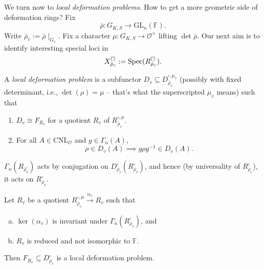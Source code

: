 \documentclass[reqno]{amsart} 
\numberwithin{theorem}{section}
\numberwithin{equation}{section}
\numberwithin{exercise}{section}
\begin{document}
We turn now to \emph{local deformation problems}.  How to get a more geometric side of deformation rings?  Fix
\begin{equation*}
  \bar{\rho} : G_{K, S} \rightarrow \mathrm{GL}_n(\mathbb{F}).
\end{equation*}
Write $\bar{\rho}_v := \bar{\rho} \mid_{G_v}$.  Fix a character $\mu : G_{K, S} \rightarrow \mathcal{O}^\times$ lifting $\det \bar{\rho}$.  Our next aim is to identify interesting special loci in
\begin{equation*}
  X_{\bar{\rho}_v}^{\square} := \operatorname{Spec}(R_{\bar{\rho}_v}^{\square}).
\end{equation*}
\begin{definition}\label{definition:cq6thpcze8}
  A \emph{local deformation problem} is a subfunctor $D_v \subseteq D_{\bar{\rho}_v}^{\square, \mu_v}$ (possibly with fixed determinant, i.e., $\det(\rho) = \mu$ -- that's what the superscripted $\mu_v$ means) such that
  \begin{enumerate}
  \item\label{enumerate:cq6s0pdihm} $D_v \cong F_{R_v}$ for a quotient $R_v$ of $R_{\bar{\rho}_v}^{\square, \mu}$.
  \item\label{enumerate:cq6s0pgpcr} For all $A \in \mathrm{CNL}_{\mathcal{O}}$ and $g \in \Gamma_n(A)$,
    \begin{equation*}
      \rho \in D_v(A) \implies g \rho g^{-1} \in D_v(A).
    \end{equation*}
  \end{enumerate}
\end{definition}
\begin{remark}
  $\Gamma_n(R_{\bar{\rho}_v^{\square}})$ acts by conjugation on $D_{\bar{\rho}_v}^{\square}(R_{\bar{\rho}_v}^{\square})$, and hence (by universality of $R_{\bar{\rho}_v}^{\square}$), it acts on $R_{\bar{\rho}_v}^{\square}$.
\end{remark}
\begin{proposition}\label{proposition:cq6thpcxtk}
  Let $R_v$ be a quotient $R_{\bar{\rho}_v}^{\square, \mu} \xrightarrow{\alpha_v} R_v$ such that
  \begin{enumerate}[(a)]
  \item\label{enumerate:cq6s0pxwwm} $\ker(\alpha_v)$ is invariant under $\Gamma_n(R_{\bar{\rho}_v}^{\square})$, and
  \item\label{enumerate:cq6s0pxv8b} $R_v$ is reduced and not isomorphic to $\mathbb{F}$.
  \end{enumerate}
  Then $F_{R_v} \subseteq D_{\bar{\rho}_v}^{\square}$ is a local deformation problem.
\end{proposition}
\end{document}
